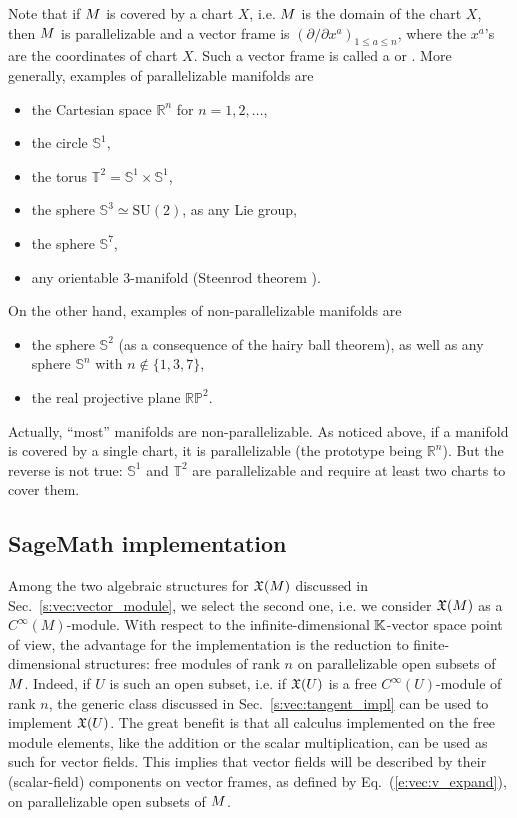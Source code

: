 Note that if $M$ is covered by a chart $X$, i.e. $M$ is the domain of
the chart $X$, then $M$ is parallelizable and a vector frame
is $(\partial/\partial x^a)_{1\leq a \leq n}$, where the $x^a$'s are
the coordinates of chart $X$. Such a vector frame is called a
 or . More generally, examples of parallelizable manifolds are
\cite{Lee13}
\begin{itemize}
\item the Cartesian space $\mathbb{R}^n$ for $n=1,2,\ldots$,
\item the circle $\mathbb{S}^1$,
\item the torus $\mathbb{T}^2 = \mathbb{S}^1\times \mathbb{S}^1$,
\item the sphere $\mathbb{S}^3 \simeq \mathrm{SU}(2)$, as any Lie group,
\item the sphere $\mathbb{S}^7$,
\item any orientable 3-manifold (Steenrod theorem \cite{Steen51}).
\end{itemize}
On the other hand, examples of non-parallelizable manifolds are
\begin{itemize}
\item the sphere $\mathbb{S}^2$ (as a consequence of the hairy ball theorem),
as well as any sphere $\mathbb{S}^n$ with $n\not\in\{1,3,7\}$,
\item the real projective plane $\mathbb{RP}^2$.
\end{itemize}
Actually, ``most'' manifolds are non-parallelizable.
As noticed above, if a manifold is covered by a single chart, it is
parallelizable (the prototype being $\mathbb{R}^n$). But the reverse is not
true: $\mathbb{S}^1$ and $\mathbb{T}^2$ are parallelizable and require
at least two charts to cover them.

\subsection{SageMath implementation} \label{s:vec:vector_field_impl}

Among the two algebraic structures for $\mathfrak{X}(M)$ discussed in Sec.~\ref{s:vec:vector_module},
we select the second one, i.e. we consider $\mathfrak{X}(M)$ as a $C^\infty(M)$-module.
With respect to the infinite-dimensional $\mathbb{K}$-vector space point of view,
the advantage for the implementation is the reduction to finite-dimensional structures: free modules of rank $n$ on parallelizable open subsets of $M$.
Indeed, if $U$ is such an open subset, i.e. if $\mathfrak{X}(U)$ is a free $C^\infty(U)$-module
of rank $n$, the generic class  discussed in
Sec.~\ref{s:vec:tangent_impl} can be used to implement $\mathfrak{X}(U)$. The great benefit
is that all calculus implemented on the free module elements, like the addition
or the scalar multiplication, can be used as such for vector fields.
This implies that vector fields will be described by their (scalar-field) components
on vector frames, as defined by Eq.~(\ref{e:vec:v_expand}), on parallelizable
open subsets of $M$.

